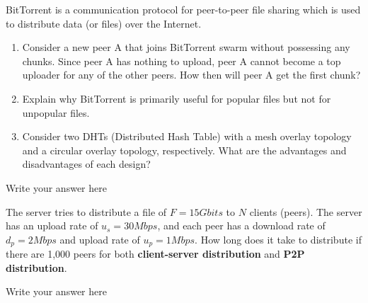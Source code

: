 \documentclass{report}
\begin{document}
\newpage


\begin{problem}
BitTorrent is a communication protocol for peer-to-peer file sharing which is used to distribute data (or files) over the Internet.
	\begin{enumerate}
		
		\item Consider a new peer A that joins BitTorrent swarm without possessing any chunks. Since peer A has nothing to upload, peer A cannot become a top uploader for any of the other peers. How then will peer A get the first chunk?
		
		\item Explain why BitTorrent is primarily useful for popular files but not for unpopular files.
		
		\item Consider two DHTs (Distributed Hash Table) with a mesh overlay topology and a circular overlay topology, respectively. What are the advantages and disadvantages of each design?
		
	\end{enumerate}

  \begin{answer}{35em}
  Write your answer here
  \end{answer}

\end{problem}

\newpage



\begin{problem}
The server tries to distribute a file of $F=15Gbits$ to $N$ clients (peers). The server has an upload rate of $u_{s}=30Mbps$, and each peer has a download rate of $d_{p}=2Mbps$ and upload rate of $u_{p}=1Mbps$. How long does it take to distribute if there are 1,000 peers for both \textbf{client-server distribution} and \textbf{P2P distribution}. \\

  \begin{answer}{35em}
  Write your answer here
  \end{answer}

\end{problem}
\end{document}
